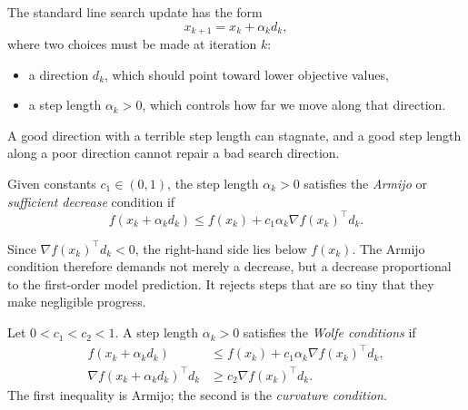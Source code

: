 \begin{notation}
	The standard line search update has the form
	\[
		x_{k+1}=x_k+\alpha_k d_k,
	\]
	where two choices must be made at iteration $k$:
	\begin{itemize}
		\item a direction $d_k$, which should point toward lower objective values,
		\item a step length $\alpha_k>0$, which controls how far we move along that direction.
	\end{itemize}
	A good direction with a terrible step length can stagnate, and a good step length along a poor direction cannot repair a bad search direction.
\end{notation}

\begin{algorithm}[H]
	\DontPrintSemicolon
	\caption{Generic Line Search Method}
\label{alg:l2-generic-line-search-method}
\end{algorithm}

\begin{definition}\label{def:l2-armijo-condition}
	Given constants $c_1 \in (0,1)$, the step length $\alpha_k>0$ satisfies the \emph{Armijo} or \emph{sufficient decrease} condition if
	\[
		f(x_k+\alpha_k d_k)
		\le
		f(x_k)+c_1 \alpha_k \nabla f(x_k)^\top d_k.
	\]
\end{definition}

\begin{intuition}
	Since $\nabla f(x_k)^\top d_k<0$, the right-hand side lies below $f(x_k)$. The Armijo condition therefore demands not merely a decrease, but a decrease proportional to the first-order model prediction. It rejects steps that are so tiny that they make negligible progress.
\end{intuition}

\begin{definition}\label{def:l2-wolfe-conditions}
	Let $0<c_1<c_2<1$. A step length $\alpha_k>0$ satisfies the \emph{Wolfe conditions} if
	\begin{align*}
		f(x_k+\alpha_k d_k)
		 & \le f(x_k)+c_1 \alpha_k \nabla f(x_k)^\top d_k,
		\\
		\nabla f(x_k+\alpha_k d_k)^\top d_k
		 & \ge c_2 \nabla f(x_k)^\top d_k.
	\end{align*}
	The first inequality is Armijo; the second is the \emph{curvature condition}.
\end{definition}

